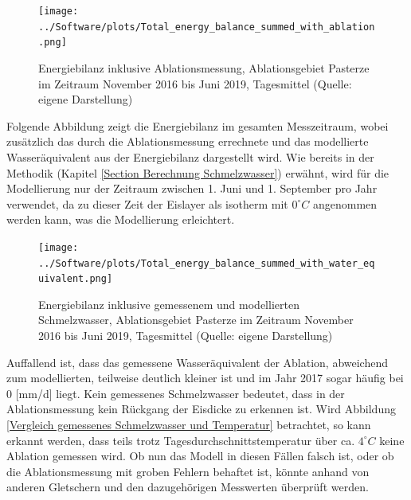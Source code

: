 \documentclass[11pt,a4paper]{article}
\begin{document}
\begin{figure}[H]
\centering
\texttt{[image: ../Software/plots/Total\_energy\_balance\_summed\_with\_ablation.png]}
\caption[Energiebilanz inklusive Ablationsmessung, Ablationsgebiet Pasterze im Zeitraum November 2016 bis Juni 2019, Tagesmittel]{Energiebilanz inklusive Ablationsmessung, Ablationsgebiet Pasterze im Zeitraum November 2016 bis Juni 2019, Tagesmittel (Quelle: eigene Darstellung)}
\label{fig:Energiebilanz im gesamten Messzeitraum inklusive Ablationsmessung}
\end{figure}


Folgende Abbildung zeigt die Energiebilanz im gesamten Messzeitraum, wobei zusätzlich das durch die Ablationsmessung errechnete und das modellierte Wasseräquivalent aus der Energiebilanz dargestellt wird. Wie bereits in der Methodik (Kapitel \ref{Section Berechnung Schmelzwasser}) erwähnt, wird für die Modellierung nur der Zeitraum zwischen 1. Juni und 1. September pro Jahr verwendet, da zu dieser Zeit der Eislayer als isotherm mit $0^\circ C$ angenommen werden kann, was die Modellierung erleichtert.  






\begin{figure}[H]
\centering
\texttt{[image: ../Software/plots/Total\_energy\_balance\_summed\_with\_water\_equivalent.png]}
\caption[Energiebilanz inklusive gemessenem und modellierten Schmelzwasser, Ablationsgebiet Pasterze im Zeitraum November 2016 bis Juni 2019, Tagesmittel]{Energiebilanz inklusive gemessenem und modellierten Schmelzwasser, Ablationsgebiet Pasterze im Zeitraum November 2016 bis Juni 2019, Tagesmittel (Quelle: eigene Darstellung)}
\label{fig:Energiebilanz im gesamten Messzeitraum inklusive gemessenem und modellierten Schmelzwasser}
\end{figure}

Auffallend ist, dass das gemessene Wasseräquivalent der Ablation, abweichend zum modellierten, teilweise deutlich kleiner ist und im Jahr 2017 sogar häufig bei 0 [mm/d] liegt. Kein gemessenes Schmelzwasser bedeutet, dass in der Ablationsmessung kein Rückgang der Eisdicke zu erkennen ist. Wird Abbildung \ref{Vergleich gemessenes Schmelzwasser und Temperatur} betrachtet, so kann erkannt werden, dass teils trotz Tagesdurchschnittstemperatur über ca. $4^\circ C$ keine Ablation gemessen wird. Ob nun das Modell in diesen Fällen falsch ist, oder ob die Ablationsmessung mit groben Fehlern behaftet ist, könnte anhand von anderen Gletschern und den dazugehörigen Messwerten überprüft werden.
\end{document}
